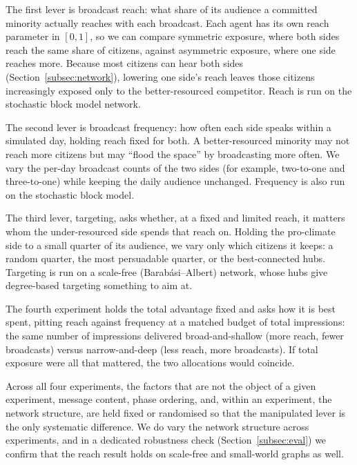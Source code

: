 \documentclass[pdflatex,sn-mathphys-num]{sn-jnl}%
\theoremstyle{thmstyleone}%
\theoremstyle{thmstyletwo}%
\theoremstyle{thmstylethree}%
\begin{document}
The first lever is broadcast reach: what share of its audience a committed minority
actually reaches with each broadcast. Each agent has its own reach parameter in $[0,1]$,
so we can compare symmetric exposure, where both sides reach the same share of citizens,
against asymmetric exposure, where one side reaches more. Because most citizens can hear
both sides (Section~\ref{subsec:network}), lowering one side's reach leaves those citizens
increasingly exposed only to the better-resourced competitor. Reach is run on the
stochastic block model network.

The second lever is broadcast frequency: how often each side speaks within a simulated
day, holding reach fixed for both. A better-resourced minority may not reach more citizens
but may ``flood the space'' by broadcasting more often. We vary the per-day broadcast
counts of the two sides (for example, two-to-one and three-to-one) while keeping the daily
audience unchanged. Frequency is also run on the stochastic block model.

The third lever, targeting, asks whether, at a fixed and limited reach, it matters whom
the under-resourced side spends that reach on. Holding the pro-climate side to a small
quarter of its audience, we vary only which citizens it keeps: a random quarter, the most
persuadable quarter, or the best-connected hubs. Targeting is run on a scale-free
(Barab\'asi--Albert) network, whose hubs give degree-based targeting something to aim at.

The fourth experiment holds the total advantage fixed and asks how it is best spent,
pitting reach against frequency at a matched budget of total impressions: the same number
of impressions delivered broad-and-shallow (more reach, fewer broadcasts) versus
narrow-and-deep (less reach, more broadcasts). If total exposure were all that mattered,
the two allocations would coincide.

Across all four experiments, the factors that are not the object of a given experiment,
message content, phase ordering, and, within an experiment, the network structure, are
held fixed or randomised so that the manipulated lever is the only systematic difference.
We do vary the network structure across experiments, and in a dedicated robustness check
(Section~\ref{subsec:eval}) we confirm that the reach result holds on scale-free and
small-world graphs as well.

\end{document}
